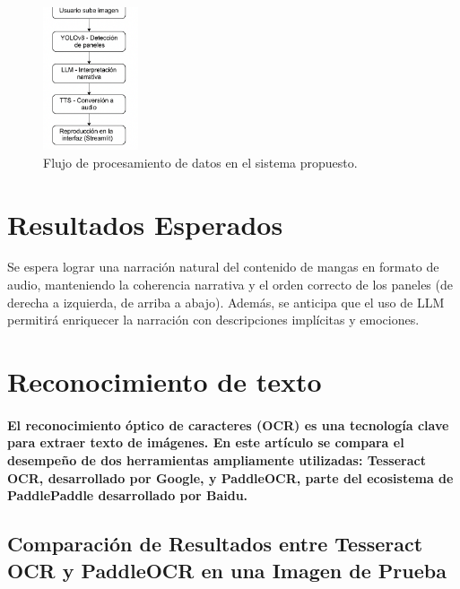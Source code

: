 \documentclass[conference]{IEEEtran}
\begin{document}
\begin{figure}[ht]
\centering
\includegraphics[width=0.25\textwidth]{resources/flujo_datos.png}
\caption{Flujo de procesamiento de datos en el sistema propuesto.}
\label{fig:flujo}
\end{figure}

\section{Resultados Esperados}
Se espera lograr una narración natural del contenido de mangas en formato de audio, manteniendo la coherencia narrativa y el orden correcto de los paneles (de derecha a izquierda, de arriba a abajo). Además, se anticipa que el uso de LLM permitirá enriquecer la narración con descripciones implícitas y emociones.

\section{Reconocimiento de texto}
\paragraph{El reconocimiento óptico de caracteres (OCR) es una tecnología clave para extraer texto de imágenes. En este artículo se compara el desempeño de dos herramientas ampliamente utilizadas: Tesseract OCR, desarrollado por Google, y PaddleOCR, parte del ecosistema de PaddlePaddle desarrollado por Baidu.}

\subsection{Comparación de Resultados entre Tesseract OCR y PaddleOCR en una Imagen de Prueba}
\end{document}
